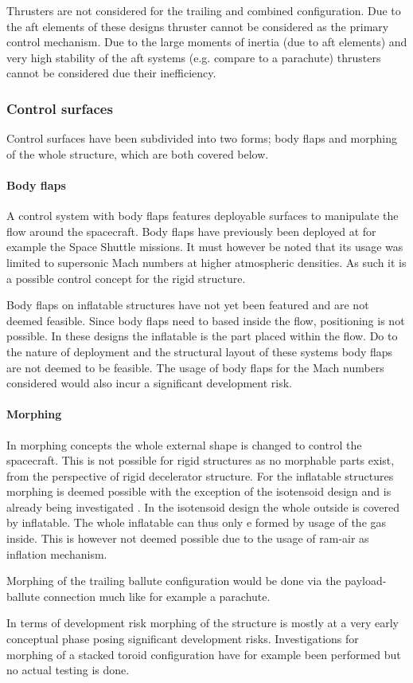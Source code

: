 Thrusters are not considered for the trailing and combined configuration. Due to the aft elements of these designs thruster cannot be considered as the primary control mechanism. Due to the large moments of inertia (due to aft elements) and very high stability of the aft systems (e.g. compare to a parachute) thrusters cannot be considered due their inefficiency. 

\subsubsection{Control surfaces}
Control surfaces have been subdivided into two forms; body flaps and morphing of the whole structure, which are both covered below.

\paragraph{Body flaps}
A control system with body flaps features deployable surfaces to manipulate the flow around the spacecraft. Body flaps have previously been deployed at for example the Space Shuttle missions. It must however be noted that its usage was limited to supersonic Mach numbers at higher atmospheric densities. As such it is a possible control concept for the rigid structure.

Body flaps on inflatable structures have not yet been featured and are not deemed feasible. Since body flaps need to based inside the flow, positioning is not possible. In these designs the inflatable is the part placed within the flow. Do to the nature of deployment and the structural layout of these systems body flaps are not deemed to be feasible. The usage of body flaps for the Mach numbers considered would also incur a significant development risk.

\paragraph{Morphing}
In morphing concepts the whole external shape is changed to control the spacecraft. This is not possible for rigid structures as no morphable parts exist, from the perspective of rigid decelerator structure. 
 For the inflatable structures morphing is deemed possible with the exception of the isotensoid design and is already being investigated \cite{Hughes2011}. In the isotensoid design the whole outside is covered by inflatable. The whole inflatable can thus only e formed by usage of the gas inside. This is however not deemed possible due to the usage of ram-air as inflation mechanism.

Morphing of the trailing ballute configuration would be done via the payload-ballute connection much like for example a parachute.

In terms of development risk morphing of the structure is mostly at a very early conceptual phase posing significant development risks. Investigations for morphing of a stacked toroid configuration have for example been performed \cite{Green2013} but no actual testing is done.
